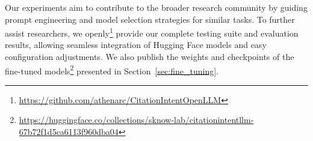 
Our experiments  aim to contribute to the broader research community by guiding prompt engineering and model selection strategies for similar tasks. To further assist researchers, we openly\footnote{\url{https://github.com/athenarc/CitationIntentOpenLLM}} provide our complete testing suite and evaluation results, allowing seamless integration of Hugging Face models and easy configuration adjustments. We also publish the weights and checkpoints of the fine-tuned models\footnote{\url{https://huggingface.co/collections/sknow-lab/citationintentllm-67b72f1d5ca6113f960dba04}} presented in Section~\ref{sec:fine_tuning}.

